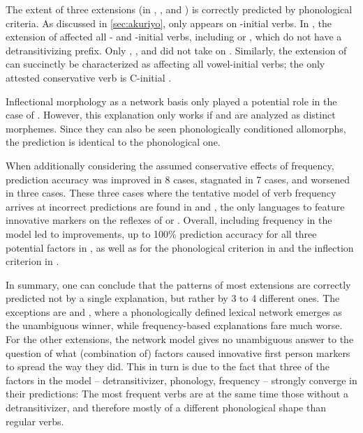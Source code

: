 The extent of three extensions (in \akuriyo, \carijo, and \yukpa) is correctly predicted by phonological criteria.
As discussed in \cref{sec:akuriyo}, \akuriyo {} only appears on -initial verbs.
In \carijo, the extension of  affected all - and -initial verbs, including   or  , which do not have a detransitivizing prefix.
Only  ,  , and   did not take on .
Similarly, the extension of \yukpa {} can succinctly be characterized as affecting all vowel-initial verbs; the only attested conservative verb is C-initial  .

Inflectional morphology as a network basis only played a potential role in the case of \akuriyo.
However, this explanation only works if  and  are analyzed as distinct morphemes.
Since they can also be seen phonologically conditioned allomorphs, the prediction is identical to the phonological one.

When additionally considering the assumed conservative effects of frequency, prediction accuracy was improved in 8 cases, stagnated in 7 cases, and worsened in three cases.
These three cases where the tentative model of verb frequency arrives at incorrect predictions are found in \carijo and \yukpa, the only languages to feature innovative markers on the reflexes of   or  .
Overall, including frequency in the model led to improvements, up to 100\% prediction accuracy for all three potential factors in \PTir, as well as for the phonological criterion in \PPek and the inflection criterion in \PWai.

In summary, one can conclude that the patterns of most extensions are correctly predicted not by a single explanation, but rather by 3 to 4 different ones.
The exceptions are \carijo and \yukpa, where a phonologically defined lexical network emerges as the unambiguous winner, while frequency-based explanations fare much worse.
For the other extensions, the network model gives no unambiguous answer to the question of what (combination of) factors caused innovative first person markers to spread the way they did.
This in turn is due to the fact that three of the factors in the model -- detransitivizer, phonology, frequency -- strongly converge in their predictions:
The most frequent  verbs are at the same time those without a detransitivizer, and therefore mostly of a different phonological shape than regular  verbs.